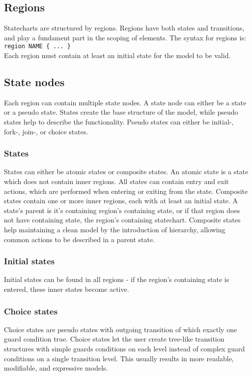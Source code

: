   \subsection{Regions}
Statecharts are structured by regions. Regions have both states and transitions, and play a fundament part in the scoping of elements. The syntax for regions is: \\\verb!region NAME { ... }!\\ Each region must contain at least an initial state for the model to be valid.
  \subsection{State nodes}
Each region can contain multiple state nodes. A state node can either be a state or a pseudo state. States create the base structure of the model, while pseudo states help to describe the functionality. Pseudo states can either be initial-, fork-, join-, or choice states.
    \subsubsection{States}
States can either be atomic states or composite states. An atomic state is a state which does not contain inner regions. All states can contain entry and exit actions, which are performed when entering or exiting from the state. Composite states contain one or more inner regions, each with at least an initial state. A state's parent is it's containing region's containing state, or if that region does not have containing state, the region's containing statechart. Composite states help maintaining a clean model by the introduction of hierarchy, allowing common actions to be described in a parent state.
    \subsubsection{Initial states}
Initial states can be found in all regions - if the region's containing state is entered, these inner states become active.
    \subsubsection{Choice states}
Choice states are pseudo states with outgoing transition of which exactly one guard condition true. Choice states let the user create tree-like transition structures with simple guards conditions on each level instead of complex guard conditions on a single transition level. This usually results in more readable, modifiable, and expressive models.
